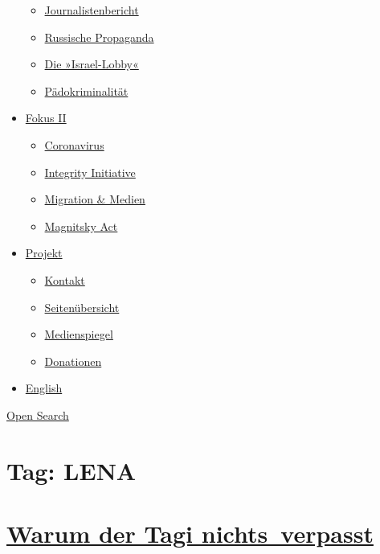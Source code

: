 \begin{itemize}
  \begin{itemize}
  \tightlist
  \item
    \href{https://swprs.org/bericht-eines-journalisten/}{Journalistenbericht}
  \item
    \href{https://swprs.org/russische-propaganda/}{Russische Propaganda}
  \item
    \href{https://swprs.org/die-israel-lobby-fakten-und-mythen/}{Die
    »Israel-Lobby«}
  \item
    \href{https://swprs.org/geopolitik-und-paedokriminalitaet/}{Pädokriminalität}
  \end{itemize}
\item
  \href{https://swprs.org/migration-und-medien/}{Fokus II}

  \begin{itemize}
  \tightlist
  \item
    \href{https://swprs.org/covid-19-hinweis-ii/}{Coronavirus}
  \item
    \href{https://swprs.org/die-integrity-initiative/}{Integrity
    Initiative}
  \item
    \href{https://swprs.org/migration-und-medien/}{Migration \& Medien}
  \item
    \href{https://swprs.org/der-fall-magnitsky/}{Magnitsky Act}
  \end{itemize}
\item
  \href{https://swprs.org/kontakt/}{Projekt}

  \begin{itemize}
  \tightlist
  \item
    \href{https://swprs.org/kontakt/}{Kontakt}
  \item
    \href{https://swprs.org/uebersicht/}{Seitenübersicht}
  \item
    \href{https://swprs.org/medienspiegel/}{Medienspiegel}
  \item
    \href{https://swprs.org/donationen/}{Donationen}
  \end{itemize}
\item
  \href{https://swprs.org/contact/}{English}
\end{itemize}

\protect\hyperlink{}{Open Search}

\hypertarget{tag-lena}{%
\section{Tag: LENA}\label{tag-lena}}

\hypertarget{warum-der-tagi-nichts-verpasst}{%
\section{\texorpdfstring{\href{https://swprs.org/2017/03/01/warum-der-tagesanzeiger-nichts-verpasst/}{Warum
der Tagi
nichts~verpasst}}{Warum der Tagi nichts~verpasst}}\label{warum-der-tagi-nichts-verpasst}}

